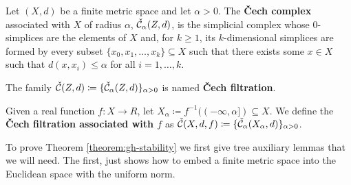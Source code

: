\begin{definition}
    Let $ (X, d) $ be a finite metric space and let $ \alpha > 0 $. The {\bf Čech complex} associated with $ X $ of radius $ \alpha $, $\check{\mathcal{C}}_\alpha(Z, d)$, is the simplicial complex whose $0$-simplices are the elements of $X$ and, for $k \geq 1$, its $k$-dimensional simplices are formed by every subset $ \{x_0, x_1, \dots, x_k\} \subseteq X $ such that there exists some $ x \in X $ such that $ d(x, x_i) \leq \alpha $ for all $i = 1, \dots, k$.

    The family $\check{\mathcal{C}}(Z, d) \coloneq \{\check{\mathcal{C}}_\alpha(Z, d)\}_{\alpha > 0}$ is named {\bf Čech filtration}.

    Given a real function $ f \colon X \to R $, let $ X_\alpha \coloneq f^{-1}((-\infty, \alpha]) \subseteq X $. We define the {\bf Čech filtration associated with $ f $} as $ \check{\mathcal{C}}(X, d, f) \coloneq \{\check{\mathcal{C}}_\alpha(X_\alpha, d)\}_{\alpha>0}$.
\end{definition}

To prove Theorem \ref{theorem:gh-stability} we first give tree auxiliary lemmas that we will need. The first, just shows how to embed a finite metric space into the Euclidean space with the uniform norm.

